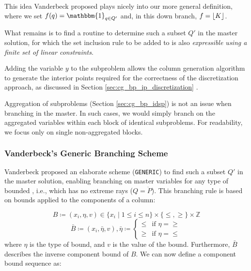 This idea Vanderbeck proposed plays nicely into our more general definition, where we set $f(q) = \mathbbm{1}_{q \in Q'}$ and, in this down branch, $f = \lfloor K\rfloor$.

What remains is to find a routine to determine such a subset $Q'$ in the master solution, for which the set inclusion rule to be added to \SP{} is also \textit{expressible using a finite set of linear constraints}.

\begin{note}
Adding the variable $y$ to the subproblem allows the column generation algorithm to generate the interior points required for the correctness of the discretization approach, as discussed in Section \ref{sec:cg_bp_ip_discretization} \cite{vanderbeck1996exact}.
\end{note}

\begin{note}
Aggregation of subproblems (Section \ref{sec:cg_bp_idsp}) is not an issue when branching in the master. In such cases, we would simply branch on the aggregated variables within each block of identical subproblems. For readability, we focus only on single non-aggregated blocks.
\end{note}

\subsubsection{Vanderbeck's Generic Branching Scheme}\label{sec:cg_bp_bp_branching_generic}
Vanderbeck proposed an elaborate scheme (\texttt{GENERIC}) \cite{vanderbeck2010reformulation,vanderbeck1996exact} to find such a subset $Q'$ in the master solution, enabling branching on master variables for any type of bounded \IP{}, i.e., which has no extreme rays ($Q = \ddot{P}$). This branching rule is based on bounds applied to the components of a column:

\begin{equation}
B \coloneqq \left( x_i, \eta, v \right) \in \{x_i \mid 1 \leq i \leq n\} \times \{\leq, \geq\} \times \mathbb{Z}
\end{equation}
\begin{equation}
\bar{B} \coloneqq \left( x_i, \bar{\eta}, v \right), \bar{\eta} \coloneqq \begin{cases} \leq & \text{if } \eta = \geq \\ \geq & \text{if } \eta = \leq \end{cases}
\end{equation}
where $\eta$ is the type of bound, and $v$ is the value of the bound. Furthermore, $\bar{B}$ describes the inverse component bound of $B$. We can now define a component bound sequence as:

